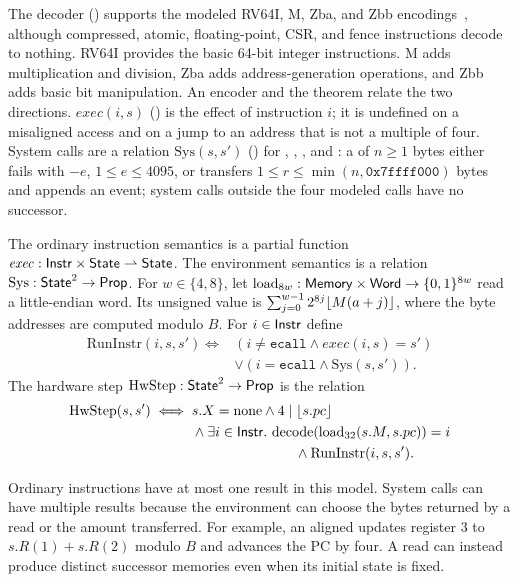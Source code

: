 The decoder () supports the modeled RV64I, M, Zba, and Zbb encodings~\cite{riscvspec}, although compressed, atomic, floating-point, CSR, and fence instructions decode to nothing. RV64I provides the basic 64-bit integer instructions. M adds multiplication and division, Zba adds address-generation operations, and Zbb adds basic bit manipulation. An encoder and the theorem  relate the two directions. $\mathit{exec}(i,s)$ () is the effect of instruction $i$; it is undefined on a misaligned access and on a jump to an address that is not a multiple of four. System calls are a relation $\mathrm{Sys}(s,s')$ () for , , , and : a  of $n\ge1$ bytes either fails with $-e$, $1\le e\le4095$, or transfers $1\le r\le\min(n,\mathtt{0x7ffff000})$ bytes and appends an event; system calls outside the four modeled calls have no successor.

\begin{definition}\label{def:hwstep}
The ordinary instruction semantics is a partial function $\mathit{exec}:\mathsf{Instr}\times\mathsf{State}\rightharpoonup\mathsf{State}$. The environment semantics is a relation $\mathrm{Sys}:\mathsf{State}^2\to\mathsf{Prop}$. For $w\in\{4,8\}$, let $\mathrm{load}_{8w}:\mathsf{Memory}\times\mathsf{Word}\to\{0,1\}^{8w}$ read a little-endian word. Its unsigned value is $\sum_{j=0}^{w-1}2^{8j}\lfloor M(a+j)\rfloor$, where the byte addresses are computed modulo $B$. For $i\in\mathsf{Instr}$ define
\[
\begin{aligned}
\mathrm{RunInstr}(i,s,s')\iff{}& (i\ne\mathtt{ecall}\land\mathit{exec}(i,s)=s')\\
 &\lor(i=\mathtt{ecall}\land\mathrm{Sys}(s,s')).
\end{aligned}
\]
The hardware step $\mathrm{HwStep}:\mathsf{State}^2\to\mathsf{Prop}$ is the relation
\[
\begin{aligned}
\HwStep(s,s')\iff{}& s.X=\mathrm{none}\land 4\mid\un{s.pc}\\
&\land\exists i\in\Ty{Instr}.\ \mathrm{decode}(\mathrm{load}_{32}(s.M,s.pc))=i\\
&\hspace{26mm}\land\mathrm{RunInstr}(i,s,s').
\end{aligned}
\]
\end{definition}
Ordinary instructions have at most one result in this model. System calls can have multiple results because the environment can choose the bytes returned by a read or the amount transferred. For example, an aligned  updates register $3$ to $s.R(1)+s.R(2)$ modulo $B$ and advances the PC by four. A read can instead produce distinct successor memories even when its initial state is fixed.

